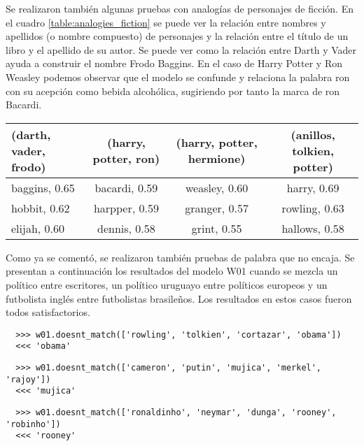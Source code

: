 Se realizaron también algunas pruebas con analogías de personajes de ficción. En el cuadro
\ref{table:analogies_fiction} se puede ver la relación entre nombres y apellidos
(o nombre compuesto) de personajes y la relación entre el título de un libro y el apellido de su
autor. Se puede ver como la relación entre Darth y Vader ayuda a construir el nombre Frodo
Baggins. En el caso de Harry Potter y Ron Weasley podemos observar que el modelo se
confunde y relaciona la palabra ron con su acepción como bebida alcohólica, sugiriendo por
tanto la marca de ron Bacardi.

\begin{table*}[ht]
    \centering
    \begin{tabular}{lccc}
        \hline
        (darth, vader, frodo) & (harry, potter, ron) & (harry, potter, hermione) & (anillos, tolkien, potter)\\
        \hline
        baggins, 0.65 & bacardi, 0.59 & weasley, 0.60 & harry, 0.69\\
        hobbit, 0.62 & harpper, 0.59 & granger, 0.57 & rowling, 0.63\\
        elijah, 0.60 & dennis, 0.58 & grint, 0.55 & hallows, 0.58\\
        \hline
    \end{tabular}
    \caption{Analogías relacionadas a personajes y autores de ficción.}
    \label{table:analogies_fiction}
\end{table*}

Como ya se comentó, se realizaron también pruebas de palabra que no encaja. Se presentan
a continuación los resultados del modelo W01 cuando se mezcla un político entre escritores, un
político uruguayo entre políticos europeos y un futbolista inglés entre futbolistas brasileños. Los
resultados en estos casos fueron todos satisfactorios.

\begin{lstlisting}
  >>> w01.doesnt_match(['rowling', 'tolkien', 'cortazar', 'obama'])
  <<< 'obama'
\end{lstlisting}

\begin{lstlisting}
  >>> w01.doesnt_match(['cameron', 'putin', 'mujica', 'merkel', 'rajoy'])
  <<< 'mujica'
\end{lstlisting}

\begin{lstlisting}
  >>> w01.doesnt_match(['ronaldinho', 'neymar', 'dunga', 'rooney', 'robinho'])
  <<< 'rooney'
\end{lstlisting}

